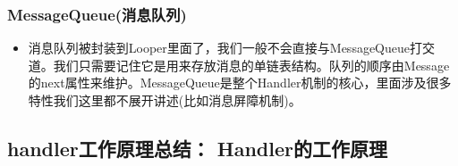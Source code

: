 \documentclass[9pt, b5paper]{article}
\begin{document}
\subsubsection{MessageQueue(消息队列)}
\label{sec-2-2-5}
\begin{itemize}
\item 消息队列被封装到Looper里面了，我们一般不会直接与MessageQueue打交道。我们只需要记住它是用来存放消息的单链表结构。队列的顺序由Message的next属性来维护。MessageQueue是整个Handler机制的核心，里面涉及很多特性我们这里都不展开讲述(比如消息屏障机制)。
\end{itemize}

\subsection{handler工作原理总结： Handler的工作原理}
\label{sec-2-3}
\end{document}
